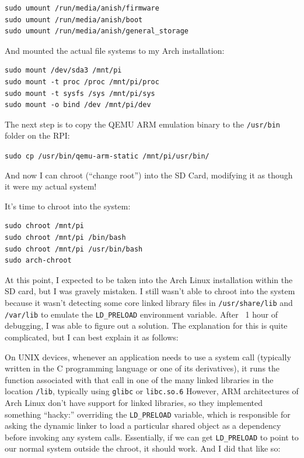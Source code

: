 \begin{verbatim}
sudo umount /run/media/anish/firmware
sudo umount /run/media/anish/boot
sudo umount /run/media/anish/general_storage
\end{verbatim}

And mounted the actual file systems to my Arch installation:

\begin{verbatim}
sudo mount /dev/sda3 /mnt/pi
sudo mount -t proc /proc /mnt/pi/proc
sudo mount -t sysfs /sys /mnt/pi/sys
sudo mount -o bind /dev /mnt/pi/dev
\end{verbatim}

The next step is to copy the QEMU ARM emulation binary to the \Verb"/usr/bin" folder on the RPI:

\Verb"sudo cp /usr/bin/qemu-arm-static /mnt/pi/usr/bin/"

And now I can chroot (“change root”) into the SD Card, modifying it as though it were my actual system!

\newpage 


It's time to chroot into the system:

\begin{verbatim}
sudo chroot /mnt/pi
sudo chroot /mnt/pi /bin/bash
sudo chroot /mnt/pi /usr/bin/bash
sudo arch-chroot
\end{verbatim}

At this point, I expected to be taken into the Arch Linux installation within the SD card, but I was gravely mistaken. I still wasn't able to chroot into the system because it wasn't detecting some core linked library files in \Verb"/usr/share/lib" and \Verb"/var/lib" to emulate the \Verb"LD_PRELOAD" environment variable. After ~1 hour of debugging, I was able to figure out a solution. The explanation for this is quite complicated, but I can best explain it as follows:

On UNIX devices, whenever an application needs to use a system call (typically written in the C programming language or one of its derivatives), it runs the function associated with that call in one of the many linked libraries in the location \Verb"/lib", typically using \Verb"glibc" or \Verb"libc.so.6" However, ARM architectures of Arch Linux don't have support for linked libraries, so they implemented something “hacky:” overriding the \Verb"LD_PRELOAD" variable, which is responsible for asking the dynamic linker to load a particular shared object as a dependency before invoking any system calls. Essentially, if we can get \Verb"LD_PRELOAD" to point to our normal system outside the chroot, it should work. And I did that like so:

